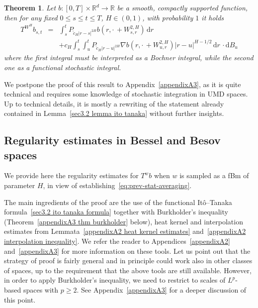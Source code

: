 \documentclass[10pt]{article}
\newcommand{\mathd}{\mathrm{d}}
\newtheorem{theorem}{Theorem}
\begin{document}
\begin{theorem}
  \label{sec3.2 functional ito tanaka}Let $b : [0, T] \times \mathbb{R}^d
  \rightarrow \mathbb{R}$ be a smooth, compactly supported function, then for
  any fixed $0 \leqslant s \leqslant t \leqslant T$, $H \in (0, 1)$, with
  probability $1$ it holds
  \begin{eqnarray}
    T^{W^H} b_{s, t} & = & \int_s^t P_{\tilde{c}_H | r - s |^{2 H}} b \left(
    r, \cdot \, + W^{2, H}_{s, r} \right) \, \mathd r \label{sec3.2 ito tanaka
    formula} \\
    &  & + c_H \int_s^t \int_u^t P_{\tilde{c}_H | r - u |^{2 H}} \nabla b
    \left( r, \cdot \, + W^{2, H}_{u, r} \right) | r - u |^{H - 1 / 2} \,
    \mathd r \, \cdot \mathd B_u \nonumber
  \end{eqnarray}
  where the first integral must be interpreted as a Bochner integral, while
  the second one as a functional stochastic integral.
\end{theorem}

We postpone the proof of this result to Appendix~\ref{appendixA3}, as it is
quite technical and requires some knowledge of stochastic integration in UMD
spaces. Up to technical details, it is mostly a rewriting of the statement
already contained in Lemma~\ref{sec3.2 lemma ito tanaka} without further
insights.

\subsection{Regularity estimates in Bessel and Besov spaces}\label{sec3.3}

We provide here the regularity estimates for $T^w b$ when $w$ is sampled as a
fBm of parameter $H$, in view of
establishing~{\eqref{eq:prev-stat-averaging}}.

The main ingredients of the proof are the use of the functional
It\^{o}--Tanaka formula~{\eqref{sec3.2 ito tanaka formula}} together with
Burkholder's inequality (Theorem~\ref{appendixA3 thm burkholder} below), heat
kernel and interpolation estimates from Lemmata~\ref{appendixA2 heat kernel
estimates} and~\ref{appendixA2 interpolation inequality}. We refer the reader
to Appendices~\ref{appendixA2} and~\ref{appendixA3} for more information on
these tools. Let us point out that the strategy of proof is fairly general and
in principle could work also in other classes of spaces, up to the requirement
that the above tools are still available. However, in order to apply
Burkholder's inequality, we need to restrict to scales of $L^p$\mbox{-}based
spaces with $p \geqslant 2$. See Appendix~\ref{appendixA3} for a deeper
discussion of this point.
\end{document}
